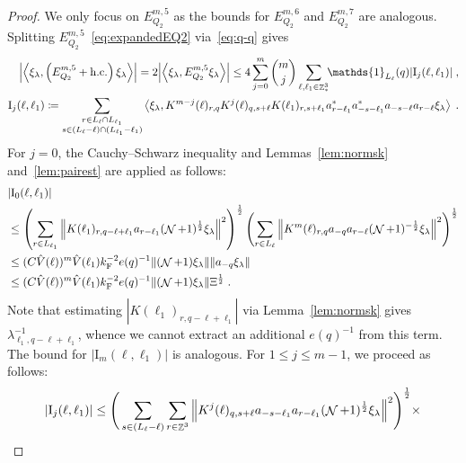 \documentclass[12pt,a4paper]{article}
\numberwithin{equation}{section}
\newcommand{\1}{\mathbb{I}}
\newcommand{\F}{\mathrm{F}}
\newcommand{\I}{\mathrm{I}}
\DeclareMathOperator{\Z}{\mathbb{Z}}
\DeclareMathOperator{\NN}{\mathcal{N}}
\newcommand{\half}{\frac{1}{2}}
\newcommand{\eva}[1]{\left\langle #1 \right\rangle}
\theoremstyle{plain}
\theoremstyle{definition}
\theoremstyle{remark}
\theoremstyle{plain}
\theoremstyle{definition}
\theoremstyle{remark}
\begin{document}
\begin{proof}
We only focus on $ E^{m,5}_{Q_2} $ as the bounds for $ E^{m,6}_{Q_2} $ and $ E^{m,7}_{Q_2} $ are analogous. Splitting $ E^{m,5}_{Q_2} $~\eqref{eq:expandedEQ2} via~\eqref{eq:q-q} gives
\begin{equation} \label{eq:EQ2131}
\begin{aligned}
	\abs{\eva{\xi_\lambda,\left(E^{m,5}_{Q_2}+\mathrm{h.c.}\right) \xi_\lambda }} 
	= 2\abs{\eva{\xi_\lambda, E^{m,5}_{Q_2} \xi_\lambda }}
	\le 4 \sum_{j=0}^m {{m}\choose j} \sum\limits_{\ell,\ell_1  \in \Z^3_*}\!\! \mathds{1}_{L_\ell}(q) |\I_j(\ell, \ell_1)| \;,\\
	\I_j(\ell, \ell_1)
	\coloneq \sum\limits_{\substack{r\in L_{\ell} \cap L_{\ell_1}\\ s \in (L_{\ell} - \ell) \cap (L_{\ell_1} - \ell_1)}}
		\eva{\xi_\lambda, K^{m-j}(\ell)_{r,q} K^{j}(\ell)_{q,s+\ell} K(\ell_1)_{r,s+\ell_1} a^*_{r-\ell_1} a^*_{-s-\ell_1} a_{-s-\ell} a_{r-\ell} \xi_\lambda} \;. \\
\end{aligned}
\end{equation}
For $ j = 0 $, the Cauchy--Schwarz inequality and Lemmas~\ref{lem:normsk} and~\ref{lem:pairest} are applied as follows:
\begin{align}
	&|\I_0(\ell, \ell_1)| \nonumber\\
	&\leq \left(\sum\limits_{r\in L_{\ell_1}} \norm{ K(\ell_1)_{r,q-\ell+\ell_1} a_{r-\ell_1}(\NN+1)^{\half} \xi_\lambda}^2\right)^\half
		\left(\sum\limits_{r\in L_{\ell}} \norm{ K^m(\ell)_{r,q} a_{-q}a_{r-\ell} (\NN+1)^{-\half} \xi_\lambda }^2 \right)^\half \nonumber\\
	&\leq (C \hat{V}(\ell))^m \hat{V}(\ell_1) k_{\F}^{-2} e(q)^{-1} \norm{ (\NN+1) \xi_\lambda} \norm{ a_{-q} \xi_\lambda } \nonumber \\
	&\leq (C \hat{V}(\ell))^m
		\hat{V}(\ell_1)
		k_{\F}^{-2} e(q)^{-1}
		\norm{ (\NN+1) \xi_\lambda} \Xi^{\half} \;.
\end{align}
Note that estimating $ |K(\ell_1)_{r,q-\ell+\ell_1}| $ via Lemma~\ref{lem:normsk} gives $ \lambda_{\ell_1,q-\ell+\ell_1}^{-1} $, whence we cannot extract an additional $ e(q)^{-1} $ from this term.
The bound for $ |\I_m(\ell, \ell_1)| $ is analogous. For $ 1 \le j \le m-1 $, we proceed as follows:
\begin{align}
	|\I_j(\ell, \ell_1)|
	&\leq \Bigg( \sum\limits_{ s \in (L_{\ell}-\ell) } \sum\limits_{r\in \Z^3} \norm{ K^{j}(\ell)_{q,s+\ell} a_{-s-\ell_1} a_{r-\ell_1} (\NN+1)^{\half} \xi_\lambda}^2\Bigg)^\half\nonumber \times \\ 

\end{align}
\end{proof}
\end{document}
